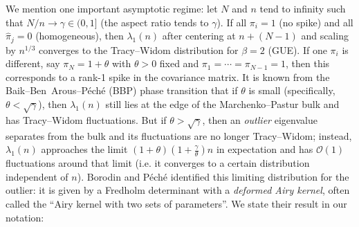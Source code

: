 \documentclass[letterpaper,11pt,oneside,reqno]{article}
\numberwithin{equation}{section}
\theoremstyle{definition}
\begin{document}
We mention one important asymptotic regime: let $N$ and $n$ tend to infinity such that $N/n \to \gamma \in(0,1]$ (the aspect ratio tends to $\gamma$). If all $\pi_i=1$ (no spike) and all $\hat\pi_j=0$ (homogeneous), then $\lambda_1(n)$ after centering at $n+(N-1)$ and scaling by $n^{1/3}$ converges to the Tracy--Widom distribution for $\beta=2$ (GUE). If one $\pi_i$ is different, say $\pi_N=1+\theta$ with $\theta>0$ fixed and $\pi_1=\cdots=\pi_{N-1}=1$, then this corresponds to a rank-1 spike in the covariance matrix. It is known from the Baik--Ben~Arous--P\'ech\'e (BBP) phase transition \cite{BaikBenArousPeche2005} that if $\theta$ is small (specifically, $\theta < \sqrt{\gamma}$), then $\lambda_1(n)$ still lies at the edge of the Marchenko--Pastur bulk and has Tracy--Widom fluctuations. But if $\theta > \sqrt{\gamma}$, then an \emph{outlier} eigenvalue separates from the bulk and its fluctuations are no longer Tracy--Widom; instead, $\lambda_1(n)$ approaches the limit $(1+\theta)(1+\frac{\gamma}{\theta}) n$ in expectation and has $\mathcal{O}(1)$ fluctuations around that limit (i.e. it converges to a certain distribution independent of $n$). Borodin and P\'ech\'e \cite{BorodinPeche2008} identified this limiting distribution for the outlier: it is given by a Fredholm determinant with a \emph{deformed Airy kernel}, often called the ``Airy kernel with two sets of parameters''. We state their result in our notation:
\end{document}
